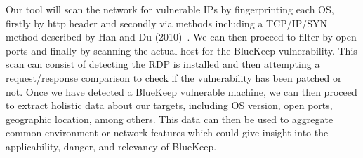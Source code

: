 Our tool will scan the network for vulnerable IPs by fingerprinting each OS, firstly by http header and secondly via methods including a TCP/IP/SYN method described by Han and Du (2010)~\cite{han_du_2010}. We can then proceed to filter by open ports and finally by scanning the actual host for the BlueKeep vulnerability. This scan can consist of detecting the RDP is installed and then  attempting a request/response comparison to check if the vulnerability has been patched or not. Once we have detected a BlueKeep vulnerable machine, we can then proceed to extract holistic data about our targets, including OS version, open ports, geographic location, among others. This data can then be used to aggregate common environment or network features which could give insight into the applicability, danger, and relevancy of BlueKeep.